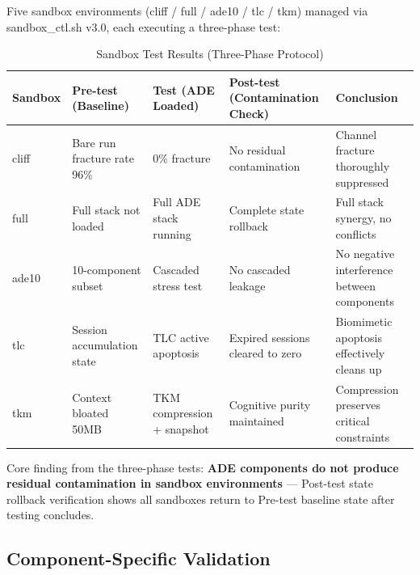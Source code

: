 \documentclass[11pt,a4paper]{article}
\begin{document}
Five sandbox environments (cliff / full / ade10 / tlc / tkm) managed via sandbox\_ctl.sh v3.0, each executing a three-phase test:

\begin{table}[htbp]
\centering
\caption{Sandbox Test Results (Three-Phase Protocol)}
\label{tab:sandbox}
\begin{tabular}{p{}p{}p{}p{}p{}}
\hline
\textbf{Sandbox} & \textbf{Pre-test (Baseline)} & \textbf{Test (ADE Loaded)} & \textbf{Post-test (Contamination Check)} & \textbf{Conclusion} \\
\hline
cliff & Bare run fracture rate 96\% & 0\% fracture & No residual contamination & Channel fracture thoroughly suppressed \\
full & Full stack not loaded & Full ADE stack running & Complete state rollback & Full stack synergy, no conflicts \\
ade10 & 10-component subset & Cascaded stress test & No cascaded leakage & No negative interference between components \\
tlc & Session accumulation state & TLC active apoptosis & Expired sessions cleared to zero & Biomimetic apoptosis effectively cleans up \\
tkm & Context bloated 50MB & TKM compression + snapshot & Cognitive purity maintained & Compression preserves critical constraints \\
\hline
\end{tabular}
\end{table}

Core finding from the three-phase tests: \textbf{ADE components do not produce residual contamination in sandbox environments} --- Post-test state rollback verification shows all sandboxes return to Pre-test baseline state after testing concludes.

\subsection{Component-Specific Validation}
\label{sec:11.5}
\end{document}
